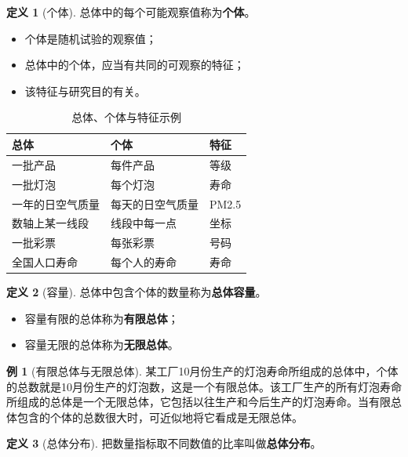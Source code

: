 \documentclass[11pt,a4paper]{report}
\theoremstyle{definition}
\newtheorem{definition}{定义}[chapter]
\newtheorem{example}{例}[chapter]
\begin{document}
\begin{definition}[个体]
总体中的每个可能观察值称为\textbf{个体}。
\begin{itemize}[leftmargin=2em]
    \item 个体是随机试验的观察值；
    \item 总体中的个体，应当有共同的可观察的特征；
    \item 该特征与研究目的有关。
\end{itemize}
\end{definition}

\begin{table}[htbp]
\centering
\caption{总体、个体与特征示例}
\begin{tabular}{@{}lll@{}}
\toprule
\textbf{总体} & \textbf{个体} & \textbf{特征} \\
\midrule
一批产品 & 每件产品 & 等级 \\
一批灯泡 & 每个灯泡 & 寿命 \\
一年的日空气质量 & 每天的日空气质量 & PM2.5 \\
数轴上某一线段 & 线段中每一点 & 坐标 \\
一批彩票 & 每张彩票 & 号码 \\
全国人口寿命 & 每个人的寿命 & 寿命 \\
\bottomrule
\end{tabular}
\end{table}

\begin{definition}[容量]
总体中包含个体的数量称为\textbf{总体容量}。
\begin{itemize}[leftmargin=2em]
    \item 容量有限的总体称为\textbf{有限总体}；
    \item 容量无限的总体称为\textbf{无限总体}。
\end{itemize}
\end{definition}

\begin{example}[有限总体与无限总体]
某工厂10月份生产的灯泡寿命所组成的总体中，个体的总数就是10月份生产的灯泡数，这是一个有限总体。该工厂生产的所有灯泡寿命所组成的总体是一个无限总体，它包括以往生产和今后生产的灯泡寿命。当有限总体包含的个体的总数很大时，可近似地将它看成是无限总体。
\end{example}

\begin{definition}[总体分布]
把数量指标取不同数值的比率叫做\textbf{总体分布}。
\end{definition}
\end{document}
